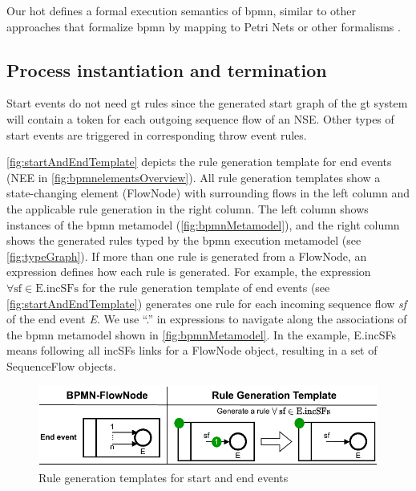 \documentclass[runningheads]{lmcs}
\begin{document}
Our \gls*{hot} defines a formal execution semantics of \gls*{bpmn}, similar to other approaches that formalize \gls*{bpmn} by mapping to Petri Nets or other formalisms \cite{dijkmanSemanticsAnalysisBusiness2008}.

\subsection{Process instantiation and termination} \label{subsec:instAndTermination}

Start events do not need \gls*{gt} rules since the generated start graph of the \gls*{gt} system will contain a token for each outgoing sequence flow of an NSE.
Other types of start events are triggered in corresponding throw event rules.

\autoref{fig:startAndEndTemplate} depicts the rule generation template for end events (\textsf{NEE} in \autoref{fig:bpmnelementsOverview}).
All rule generation templates show a state-changing element (\textsf{FlowNode}) with surrounding flows in the left column and the applicable rule generation in the right column.
The left column shows instances of the \gls*{bpmn} metamodel (\autoref{fig:bpmnMetamodel}), and the right column shows the generated rules typed by the \gls*{bpmn} execution metamodel (see \autoref{fig:typeGraph}).
If more than one rule is generated from a \textsf{FlowNode}, an expression defines how each rule is generated.
For example, the expression $\forall \text{sf} \in \text{E.incSFs}$ for the rule generation template of end events (see \autoref{fig:startAndEndTemplate}) generates one rule for each incoming sequence flow \textit{sf} of the end event \textit{E}.
We use ``.'' in expressions to navigate along the associations of the \gls*{bpmn} metamodel shown in \autoref{fig:bpmnMetamodel}.
In the example, \textsf{E.incSFs} means following all \textsf{incSFs} links for a \textsf{FlowNode} object, resulting in a set of \textsf{SequenceFlow} objects.

\begin{figure}[ht]
    \centering
    \includegraphics[width=1\textwidth]{images/end_template.pdf}
    \caption{Rule generation templates for start and end events}
    \label{fig:startAndEndTemplate}
\end{figure}
    
\end{document}

